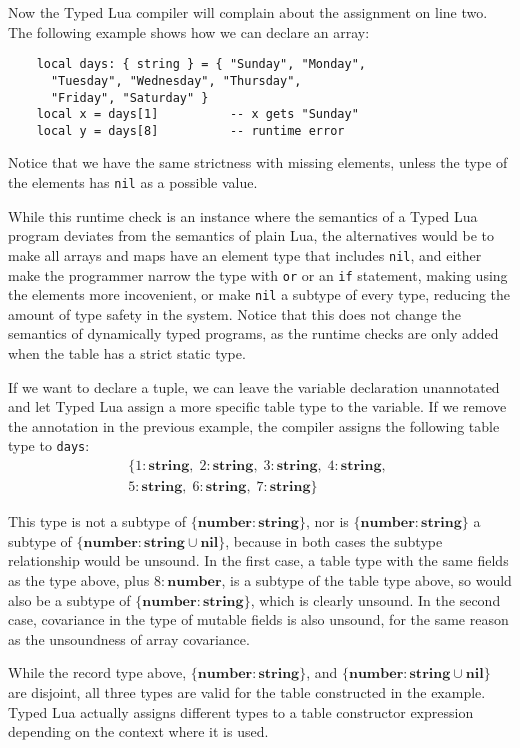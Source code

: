 \documentclass{sig-alternate}
\newcommand{\Nil}{\mathbf{nil}}
\newcommand{\Number}{\mathbf{number}}
\newcommand{\String}{\mathbf{string}}
\begin{document}
Now the Typed Lua compiler will complain about the assignment
on line two. The following example shows how we can declare
an array:
\begin{verbatim}
    local days: { string } = { "Sunday", "Monday",
      "Tuesday", "Wednesday", "Thursday",
      "Friday", "Saturday" }
    local x = days[1]          -- x gets "Sunday"
    local y = days[8]          -- runtime error
\end{verbatim}

Notice that we have the same strictness with missing
elements, unless the type of the elements has {\tt nil}
as a possible value.

While this runtime check is an instance where the semantics
of a Typed Lua program deviates from the semantics of
plain Lua, the alternatives would be to make all
arrays and maps have an element type that includes {\tt nil},
and either make the programmer narrow the type with {\tt or}
or an {\tt if} statement, making using the elements more
incovenient, or make {\tt nil} a subtype of every type,
reducing the amount of type safety in the system. Notice 
that this does not change the semantics of dynamically
typed programs, as the runtime checks are only added when
the table has a strict static type.

If we want to declare a tuple, we can leave the
variable declaration unannotated and let Typed Lua assign
a more specific table type to the variable.
If we remove the annotation in the previous example, 
the compiler assigns the following table type to \texttt{days}:
\begin{align*}
\{{1:\String},\;{2:\String},\;{3:\String},\;{4:\String},\;\\
{5:\String},\;{6:\String},\;{7:\String}\}
\end{align*}

This type is not a subtype of $\{\Number:\String\}$, nor
is $\{\Number:\String\}$ a subtype of $\{\Number:
\String\cup\Nil\}$, because in both cases the subtype
relationship would be unsound. In the first case,
a table type with the same fields as the type above,
plus $8: \Number$, is a subtype of the table type
above, so would also be a subtype of $\{\Number:\String\}$,
which is clearly unsound. In the second case, covariance
in the type of mutable fields is also unsound, for the
same reason as the unsoundness of array covariance.

While the record type above, $\{\Number:\String\}$, and
$\{\Number: \String\cup\Nil\}$ are disjoint, all three
types are valid for the table constructed in the example.
Typed Lua actually assigns different types to a table constructor
expression depending on the context where it is used.
\end{document}
